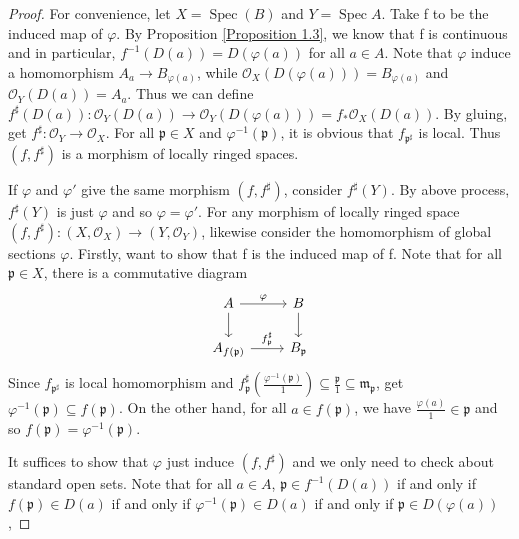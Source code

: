 \documentclass{ctexart}
\newcommand{\spec}{\operatorname{Spec}}
\begin{document}
\begin{proof}
    For convenience, let $X = \spec(B)$ and $Y = \spec A$.
    Take f to be the induced map of $\varphi$.
    By Proposition \ref{Proposition 1.3}, we know that f is continuous and in particular, $f^{-1}(D(a)) = D(\varphi(a))$ for all $a\in A$.
    Note that $\varphi$ induce a homomorphism $A_{a} \longrightarrow B_{\varphi(a)}$, while $\mathcal{O}_{X}(D(\varphi(a))) = B_{\varphi(a)}$ and $\mathcal{O}_{Y}(D(a)) = A_{a}$.
    Thus we can define $f^{\sharp}(D(a)): \mathcal{O}_{Y}(D(a)) \longrightarrow \mathcal{O}_{Y}(D(\varphi(a))) = f_{\ast}\mathcal{O}_{X}(D(a))$.
    By gluing, get $f^{\sharp}: \mathcal{O}_{Y} \longrightarrow \mathcal{O}_{X}$.
    For all $\mathfrak{p}\in X$ and $\varphi^{-1}(\mathfrak{p})$, it is obvious that $f_{\mathfrak{p}^{\sharp}}$ is local.
    Thus $(f, f^{\sharp})$ is a morphism of locally ringed spaces.
    \par
    If $\varphi$ and $\varphi'$ give the same morphism $(f, f^{\sharp})$, consider $f^{\sharp}(Y)$.
    By above process, $f^{\sharp}(Y)$ is just $\varphi$ and so $\varphi = \varphi'$.
    For any morphism of locally ringed space $(f, f^{\sharp}): (X, \mathcal{O}_{X}) \longrightarrow (Y, \mathcal{O}_{Y})$, likewise consider the homomorphism of global sections $\varphi$.
    Firstly, want to show that f is the induced map of f.
    Note that for all $\mathfrak{p}\in X$, there is a commutative diagram 
    \begin{equation*}
        \begin{tikzcd}
            A \arrow[r, "\varphi"] \arrow[d] &
            B \arrow[d] \\
            A_{f(\mathfrak{p})} \arrow[r, "f_{\mathfrak{p}}^{\sharp}"] & 
            B_{\mathfrak{p}}
        \end{tikzcd}
    \end{equation*}
    Since $f_{\mathfrak{p}^{\sharp}}$ is local homomorphism and $f_{\mathfrak{p}}^{\sharp}(\frac{\varphi^{-1}(\mathfrak{p})}{1}) \subseteq \frac{\mathfrak{p}}{1} \subseteq \mathfrak{m}_{\mathfrak{p}}$,
    get $\varphi^{-1}(\mathfrak{p}) \subseteq f(\mathfrak{p})$.
    On the other hand, for all $a\in f(\mathfrak{p})$, we have $\frac{\varphi(a)}{1}\in \mathfrak{p}$ and so $f(\mathfrak{p}) = \varphi^{-1}(\mathfrak{p})$.
    \par 
    It suffices to show that $\varphi$ just induce $(f, f^{\sharp})$ and we only need to check about standard open sets.
    Note that for all $a\in A$, $\mathfrak{p}\in f^{-1}(D(a))$ if and only if $f(\mathfrak{p})\in D(a)$ if and only if $\varphi^{-1}(\mathfrak{p})\in D(a)$ if and only if $\mathfrak{p}\in D(\varphi(a))$,

\end{proof}
\end{document}
